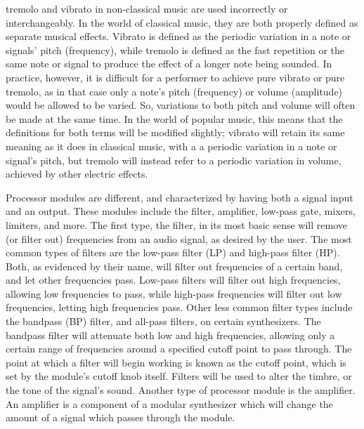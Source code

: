 tremolo and vibrato in non-classical music are used incorrectly or interchangeably. In the world of classical music, they are both properly defined as separate musical effects. Vibrato is defined as the periodic variation in a note or signals' pitch (frequency), while tremolo is defined as the fast repetition or the same note or signal to produce the effect of a longer note being sounded. In practice, however, it is difficult for a performer to achieve pure vibrato or pure tremolo, as in that case only a note's pitch (frequency) or volume (amplitude) would be allowed to be varied. So, variations to both pitch and volume will often be made at the same time. In the world of popular music, this means that the definitions for both terms will be modified slightly; vibrato will retain its same meaning as it does in classical music, with a a periodic variation in a note or signal's pitch, but tremolo will instead refer to a periodic variation in volume, achieved by other electric effects.

Processor modules are different, and characterized by having both a signal input and an output. These modules include the filter, amplifier, low-pass gate, mixers, limiters, and more. The first type, the filter, in its most basic sense will remove (or filter out) frequencies from an audio signal, as desired by the user. The most common types of filters are the low-pass filter (LP) and high-pass filter (HP). Both, as evidenced by their name, will filter out frequencies of a certain band, and let other frequencies pass. Low-pass filters will filter out high frequencies, allowing low frequencies to pass, while high-pass frequencies will filter out low frequencies, letting high frequencies pass\cite{Winer_2018}. Other less common filter types include the bandpass (BP) filter, and all-pass filters, on certain synthesizers. The bandpass filter will attenuate both low and high frequencies, allowing only a certain range of frequencies around a specified cutoff point to pass through. The point at which a filter will begin working is known as the cutoff point, which is set by the module's cutoff knob itself. Filters will be used to alter the timbre, or the tone of the signal's sound. Another type of processor module is the amplifier. An amplifier is a component of a modular synthesizer which will change the amount of a signal which passes through the module. 

